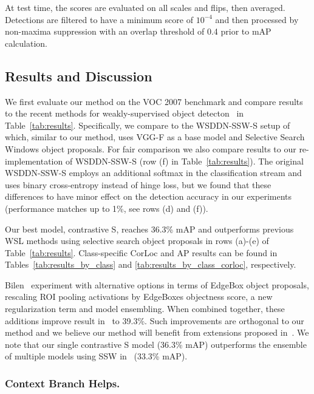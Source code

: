 At test time, the scores are evaluated on all scales and flips, then averaged.
Detections are filtered to have a minimum score of $10^{-4}$ and then processed by non-maxima suppression with an overlap threshold of 0.4 prior to mAP calculation.

\subsection{Results and Discussion}


We first evaluate our method on the VOC 2007 benchmark and compare results to the recent methods for weakly-supervised object detecton~\cite{Wang:2014tg,Bilen:2015uo} in Table~\ref{tab:results}.
Specifically, we compare to the WSDDN-SSW-S setup of~\cite{Bilen:2015uo} which, similar to our method, uses VGG-F as a base model and Selective Search Windows object proposals. For fair comparison we also compare results to our re-implementation of WSDDN-SSW-S (row (f) in Table~\ref{tab:results}). The original WSDDN-SSW-S employs an additional softmax in the classification stream and uses binary cross-entropy instead of hinge loss, but we found that these differences to have minor effect on the detection accuracy in our experiments (performance matches up to 1\%, see rows (d) and (f)).

Our best model, contrastive S, reaches 36.3\% mAP and outperforms previous WSL methods using selective search object proposals in rows (a)-(e) of Table~\ref{tab:results}.
Class-specific CorLoc and AP results can be found in Tables~\ref{tab:results_by_class} and \ref{tab:results_by_class_corloc}, respectively.

Bilen~\etal\cite{Bilen:2015uo} experiment with alternative options in terms of EdgeBox object proposals, rescaling ROI pooling activations by EdgeBoxes objectness score, a new regularization term and model ensembling. When combined together, these additions improve result in~\cite{Bilen:2015uo} to 39.3\%. Such improvements are orthogonal to our method and we believe our method will benefit from extensions proposed in~\cite{Bilen:2015uo}. We note that our single contrastive S model (36.3\% mAP) outperforms the ensemble of multiple models using SSW in~\cite{Bilen:2015uo} (33.3\% mAP).


\subsubsection{Context Branch Helps.} 


